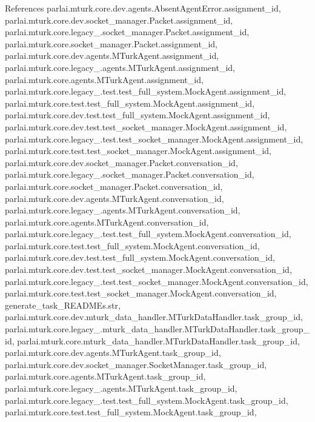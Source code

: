 References parlai.\+mturk.\+core.\+dev.\+agents.\+Absent\+Agent\+Error.\+assignment\+\_\+id, parlai.\+mturk.\+core.\+dev.\+socket\+\_\+manager.\+Packet.\+assignment\+\_\+id, parlai.\+mturk.\+core.\+legacy\+\_.\+socket\+\_\+manager.\+Packet.\+assignment\+\_\+id, parlai.\+mturk.\+core.\+socket\+\_\+manager.\+Packet.\+assignment\+\_\+id, parlai.\+mturk.\+core.\+dev.\+agents.\+M\+Turk\+Agent.\+assignment\+\_\+id, parlai.\+mturk.\+core.\+legacy\+\_.\+agents.\+M\+Turk\+Agent.\+assignment\+\_\+id, parlai.\+mturk.\+core.\+agents.\+M\+Turk\+Agent.\+assignment\+\_\+id, parlai.\+mturk.\+core.\+legacy\+\_.\+test.\+test\+\_\+full\+\_\+system.\+Mock\+Agent.\+assignment\+\_\+id, parlai.\+mturk.\+core.\+test.\+test\+\_\+full\+\_\+system.\+Mock\+Agent.\+assignment\+\_\+id, parlai.\+mturk.\+core.\+dev.\+test.\+test\+\_\+full\+\_\+system.\+Mock\+Agent.\+assignment\+\_\+id, parlai.\+mturk.\+core.\+dev.\+test.\+test\+\_\+socket\+\_\+manager.\+Mock\+Agent.\+assignment\+\_\+id, parlai.\+mturk.\+core.\+legacy\+\_.\+test.\+test\+\_\+socket\+\_\+manager.\+Mock\+Agent.\+assignment\+\_\+id, parlai.\+mturk.\+core.\+test.\+test\+\_\+socket\+\_\+manager.\+Mock\+Agent.\+assignment\+\_\+id, parlai.\+mturk.\+core.\+dev.\+socket\+\_\+manager.\+Packet.\+conversation\+\_\+id, parlai.\+mturk.\+core.\+legacy\+\_.\+socket\+\_\+manager.\+Packet.\+conversation\+\_\+id, parlai.\+mturk.\+core.\+socket\+\_\+manager.\+Packet.\+conversation\+\_\+id, parlai.\+mturk.\+core.\+dev.\+agents.\+M\+Turk\+Agent.\+conversation\+\_\+id, parlai.\+mturk.\+core.\+legacy\+\_.\+agents.\+M\+Turk\+Agent.\+conversation\+\_\+id, parlai.\+mturk.\+core.\+agents.\+M\+Turk\+Agent.\+conversation\+\_\+id, parlai.\+mturk.\+core.\+legacy\+\_.\+test.\+test\+\_\+full\+\_\+system.\+Mock\+Agent.\+conversation\+\_\+id, parlai.\+mturk.\+core.\+test.\+test\+\_\+full\+\_\+system.\+Mock\+Agent.\+conversation\+\_\+id, parlai.\+mturk.\+core.\+dev.\+test.\+test\+\_\+full\+\_\+system.\+Mock\+Agent.\+conversation\+\_\+id, parlai.\+mturk.\+core.\+dev.\+test.\+test\+\_\+socket\+\_\+manager.\+Mock\+Agent.\+conversation\+\_\+id, parlai.\+mturk.\+core.\+legacy\+\_.\+test.\+test\+\_\+socket\+\_\+manager.\+Mock\+Agent.\+conversation\+\_\+id, parlai.\+mturk.\+core.\+test.\+test\+\_\+socket\+\_\+manager.\+Mock\+Agent.\+conversation\+\_\+id, generate\+\_\+task\+\_\+\+R\+E\+A\+D\+M\+Es.\+str, parlai.\+mturk.\+core.\+dev.\+mturk\+\_\+data\+\_\+handler.\+M\+Turk\+Data\+Handler.\+task\+\_\+group\+\_\+id, parlai.\+mturk.\+core.\+legacy\+\_.\+mturk\+\_\+data\+\_\+handler.\+M\+Turk\+Data\+Handler.\+task\+\_\+group\+\_\+id, parlai.\+mturk.\+core.\+mturk\+\_\+data\+\_\+handler.\+M\+Turk\+Data\+Handler.\+task\+\_\+group\+\_\+id, parlai.\+mturk.\+core.\+dev.\+agents.\+M\+Turk\+Agent.\+task\+\_\+group\+\_\+id, parlai.\+mturk.\+core.\+dev.\+socket\+\_\+manager.\+Socket\+Manager.\+task\+\_\+group\+\_\+id, parlai.\+mturk.\+core.\+agents.\+M\+Turk\+Agent.\+task\+\_\+group\+\_\+id, parlai.\+mturk.\+core.\+legacy\+\_.\+agents.\+M\+Turk\+Agent.\+task\+\_\+group\+\_\+id, parlai.\+mturk.\+core.\+legacy\+\_.\+test.\+test\+\_\+full\+\_\+system.\+Mock\+Agent.\+task\+\_\+group\+\_\+id, parlai.\+mturk.\+core.\+test.\+test\+\_\+full\+\_\+system.\+Mock\+Agent.\+task\+\_\+group\+\_\+id, 